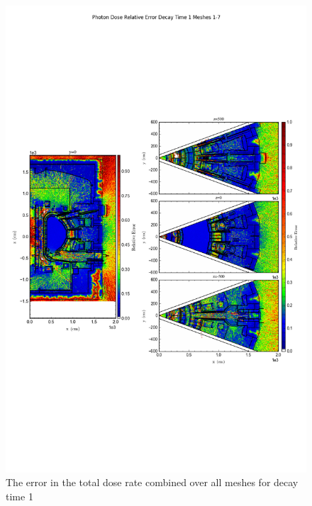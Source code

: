 \documentclass[12pt]{article}
\begin{document}
\begin{figure}[ht!]
\centering
\includegraphics[trim={0cm 9cm 0cm 10cm},clip,scale=0.75]{../plots/final_model/Photon_Dose_Relative_Error_Decay_Time_1_Meshes_1-7.png}
\caption{The error in the total dose rate combined over all meshes for decay time 1}
\label{fig:photons_dc1_no4bc_total_error}
\end{figure}
\end{document}
